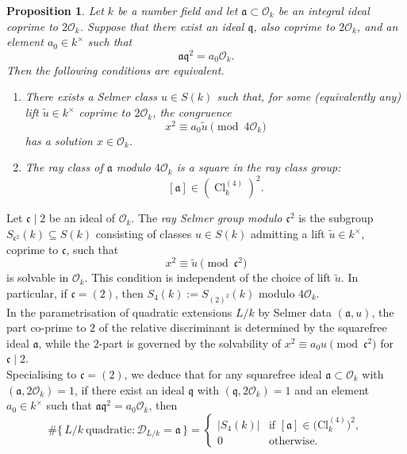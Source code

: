 \documentclass[11pt,reqno]{amsart}
\newcommand{\fa}{\mathfrak{a}}
\newcommand{\fq}{\mathfrak{q}}
\newcommand{\cO}{\mathcal{O}}
\DeclareMathOperator{\Cl}{Cl}
\newtheorem{proposition}[theorem]{Proposition}
\theoremstyle{definition}
\theoremstyle{remark}
\begin{document}
\begin{proposition}\label{existence_of_sol_for_congurence}
Let $k$ be a number field and let $\fa \subset \cO_k$ be an integral ideal
coprime to $2\cO_k$. Suppose that there exist an ideal $\fq$, also coprime to
$2\cO_k$, and an element $a_0 \in k^\times$ such that
\[
\fa \fq^{2} = a_0 \cO_k .
\]
Then the following conditions are equivalent.
\begin{enumerate}
\item There exists a Selmer class $u \in S(k)$ such that, for some (equivalently
any) lift $\tilde u \in k^\times$ coprime to $2\cO_k$, the congruence
\[
x^{2} \equiv a_0 \tilde u \pmod{4\cO_k}
\]
has a solution $x \in \cO_k$.

\item The ray class of $\fa$ modulo $4\cO_k$ is a square in the ray class group:
\[
[\fa] \in \left( \Cl_k^{(4)} \right)^{2}.
\]
\end{enumerate}
\end{proposition}


Let $\mathfrak{c} \mid 2$ be an ideal of $\mathcal{O}_k$. The 
\emph{ray Selmer group modulo $\mathfrak{c}^2$} is the subgroup 
$S_{\mathfrak{c}^2}(k) \subseteq S(k)$ consisting of classes 
$u \in S(k)$ admitting a lift $\tilde{u} \in k^\times$, 
coprime to $\mathfrak{c}$, such that 
\[
x^2 \equiv \tilde{u} \pmod{\mathfrak{c}^2}
\]
is solvable in $\mathcal{O}_k$. This condition is independent of the 
choice of lift $\tilde{u}$.
In particular, if $\mathfrak{c} = (2) $, then $S_4(k) := S_{(2)^2}(k)$ modulo $4\mathcal{O}_k$.\\

\noindent
In the parametrisation of quadratic extensions $L/k$ by Selmer data 
$(\mathfrak{a}, u)$, the part co-prime to $2$ of the relative discriminant is 
determined by the squarefree ideal $\mathfrak{a}$, while the $2$-part is 
governed by the solvability of $x^2 \equiv a_0 u \pmod{\mathfrak{c}^2}$ 
for $\mathfrak{c} \mid 2$.\\

Specialising to $\mathfrak{c} = (2)$, we deduce that for any squarefree ideal $\mathfrak{a} \subset \mathcal{O}_k$  with  $(\mathfrak{a}, 2\mathcal{O}_k) = 1$, if there exist an ideal $\mathfrak{q}$ with $(\mathfrak{q}, 2\mathcal{O}_k) = 1$ 
and an element $a_0 \in k^\times$ such that $\mathfrak{a}\mathfrak{q}^2 = a_0\mathcal{O}_k$, then
\begin{equation}\label{lem:count_disc_c2}
    \#\{\, L/k\ \text{quadratic} : \mathcal{D}_{L/k} = \mathfrak{a}\,\}
=
\begin{cases}
|S_4(k)| & \text{if } [\mathfrak{a}] \in \bigl(\mathrm{Cl}_k^{(4)}\bigr)^2, \\
0         & \text{otherwise.}
\end{cases}
\end{equation}
\end{document}
